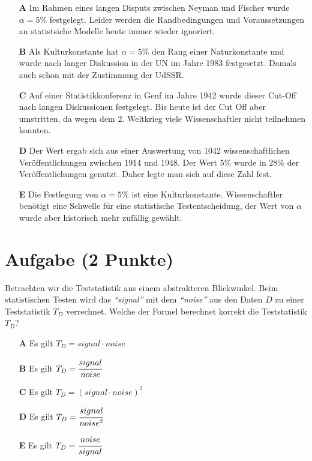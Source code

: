 \documentclass[a4paper, 9pt]{scrartcl}\usepackage[]{graphicx}\usepackage[]{xcolor}
\begin{document}
\begin{enumerate}
\item [\textbf{A} \msquare] Im Rahmen eines langen Disputs zwischen Neyman und Fischer wurde $\alpha = 5\%$ festgelegt. Leider werden die Randbedingungen und Voraussetzungen an statistsiche Modelle heute immer wieder ignoriert.
\item [\textbf{B} \msquare] Als Kulturkonstante hat $\alpha = 5\%$ den Rang einer Naturkonstante und wurde nach langer Diskussion in der UN im Jahre 1983 festgesetzt. Damals auch schon mit der Zustimmung der UdSSR.
\item [\textbf{C} \msquare] Auf einer Statistikkonferenz in Genf im Jahre 1942 wurde dieser Cut-Off nach langen Diskussionen festgelegt. Bis heute ist der Cut Off aber umstritten, da wegen dem 2. Weltkrieg viele Wissenschaftler nicht teilnehmen konnten.
\item [\textbf{D} \msquare] Der Wert ergab sich aus einer Auswertung von 1042 wissenschaftlichen Veröffentlichungen zwischen 1914 und 1948. Der Wert $5\%$ wurde in $28\%$ der Veröffentlichungen genutzt. Daher legte man sich auf diese Zahl fest.
\item [\textbf{E} \msquare] Die Festlegung von $\alpha = 5\%$ ist eine Kulturkonstante. Wissenschaftler benötigt eine Schwelle für eine statistische Testentscheidung, der Wert von $\alpha$ wurde aber historisch mehr zufällig gewählt.
\end{enumerate}

\section{Aufgabe \hfill (2 Punkte)}

Betrachten wir die Teststatistik aus einem abstrakteren Blickwinkel. Beim
statistischen Testen wird das \textit{"`signal"'} mit dem
\textit{"`noise"'} aus den Daten $D$ zu einer Teststatistik $T_D$ verrechnet. Welche der Formel
berechnet korrekt die Teststatistik $T_D$?



\begin{enumerate}
\item [\textbf{A} \msquare] Es gilt $T_D = signal \cdot noise$
\item [\textbf{B} \msquare] Es gilt $T_D = \cfrac{signal}{noise}$
\item [\textbf{C} \msquare] Es gilt $T_D = (signal \cdot noise)^2$
\item [\textbf{D} \msquare] Es gilt $T_D = \cfrac{signal}{noise^2}$
\item [\textbf{E} \msquare] Es gilt $T_D = \cfrac{noise}{signal}$
\end{enumerate}
\end{document}
